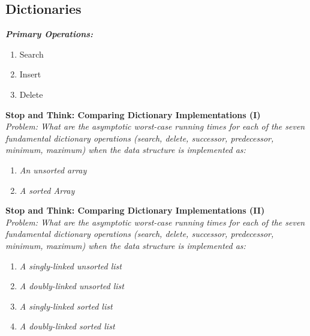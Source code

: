 \subsection{Dictionaries}

\textbf{\emph{Primary Operations:}}

\begin{enumerate}
	\item Search
	\item Insert
	\item Delete
\end{enumerate}

\textbf{Stop and Think: Comparing Dictionary Implementations (I)} \\

\emph{Problem: What are the asymptotic worst-case running times for each of the seven fundamental dictionary operations (search, delete, successor, predecessor, minimum, maximum) when the data structure is implemented as:}\\

\begin{enumerate}
	\item \emph{An unsorted array}
	\item \emph{A sorted Array}
\end{enumerate}

\noindent{}

\textbf{Stop and Think: Comparing Dictionary Implementations (II)} \\

\emph{Problem: What are the asymptotic worst-case running times for each of the seven fundamental dictionary operations (search, delete, successor, predecessor, minimum, maximum) when the data structure is implemented as:}\\

\begin{enumerate}
	\item \emph{A singly-linked unsorted list}
	\item \emph{A doubly-linked unsorted list}
	\item \emph{A singly-linked sorted list}
	\item \emph{A doubly-linked sorted list}
\end{enumerate}